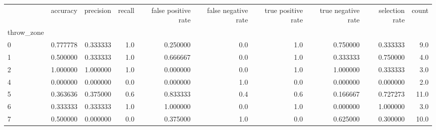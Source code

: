 \begin{tabular}{lrrrrrrrrr}
\toprule
{} &  accuracy &  precision &  recall &  false positive rate &  false negative rate &  true positive rate &  true negative rate &  selection rate &  count \\
throw\_zone &           &            &         &                      &                      &                     &                     &                 &        \\
\midrule
0          &  0.777778 &   0.333333 &     1.0 &             0.250000 &                  0.0 &                 1.0 &            0.750000 &        0.333333 &    9.0 \\
1          &  0.500000 &   0.333333 &     1.0 &             0.666667 &                  0.0 &                 1.0 &            0.333333 &        0.750000 &    4.0 \\
2          &  1.000000 &   1.000000 &     1.0 &             0.000000 &                  0.0 &                 1.0 &            1.000000 &        0.333333 &    3.0 \\
4          &  0.000000 &   0.000000 &     0.0 &             0.000000 &                  1.0 &                 0.0 &            0.000000 &        0.000000 &    2.0 \\
5          &  0.363636 &   0.375000 &     0.6 &             0.833333 &                  0.4 &                 0.6 &            0.166667 &        0.727273 &   11.0 \\
6          &  0.333333 &   0.333333 &     1.0 &             1.000000 &                  0.0 &                 1.0 &            0.000000 &        1.000000 &    3.0 \\
7          &  0.500000 &   0.000000 &     0.0 &             0.375000 &                  1.0 &                 0.0 &            0.625000 &        0.300000 &   10.0 \\
\bottomrule
\end{tabular}
